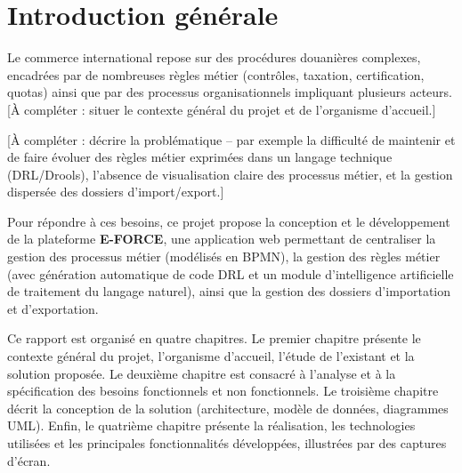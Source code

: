 \chapter*{Introduction g\'en\'erale}


Le commerce international repose sur des proc\'edures douani\`eres
complexes, encadr\'ees par de nombreuses r\`egles m\'etier (contr\^oles,
taxation, certification, quotas) ainsi que par des processus
organisationnels impliquant plusieurs acteurs. [\`A compl\'eter : situer le
contexte g\'en\'eral du projet et de l'organisme d'accueil.]

[\`A compl\'eter : d\'ecrire la probl\'ematique -- par exemple la difficult\'e
de maintenir et de faire \'evoluer des r\`egles m\'etier exprim\'ees dans un
langage technique (DRL/Drools), l'absence de visualisation claire des
processus m\'etier, et la gestion dispers\'ee des dossiers
d'import/export.]

Pour r\'epondre \`a ces besoins, ce projet propose la conception et le
d\'eveloppement de la plateforme \textbf{E-FORCE}, une application web
permettant de centraliser la gestion des processus m\'etier (mod\'elis\'es
en BPMN), la gestion des r\`egles m\'etier (avec g\'en\'eration automatique de
code DRL et un module d'intelligence artificielle de traitement du
langage naturel), ainsi que la gestion des dossiers d'importation et
d'exportation.

Ce rapport est organis\'e en quatre chapitres. Le premier chapitre
pr\'esente le contexte g\'en\'eral du projet, l'organisme d'accueil, l'\'etude
de l'existant et la solution propos\'ee. Le deuxi\`eme chapitre est
consacr\'e \`a l'analyse et \`a la sp\'ecification des besoins fonctionnels et
non fonctionnels. Le troisi\`eme chapitre d\'ecrit la conception de la
solution (architecture, mod\`ele de donn\'ees, diagrammes UML). Enfin, le
quatri\`eme chapitre pr\'esente la r\'ealisation, les technologies utilis\'ees
et les principales fonctionnalit\'es d\'evelopp\'ees, illustr\'ees par des
captures d'\'ecran.

\clearpage
